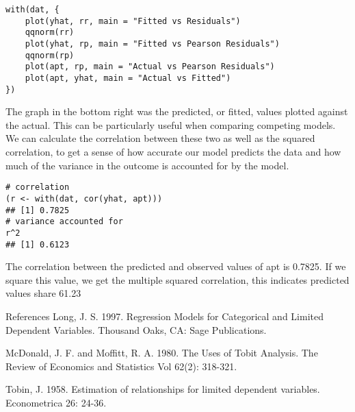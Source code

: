\documentclass{beamer}
\begin{document}
\begin{frame}[fragile]
	\begin{framed}
		\begin{verbatim}
with(dat, {
	plot(yhat, rr, main = "Fitted vs Residuals")
	qqnorm(rr)
	plot(yhat, rp, main = "Fitted vs Pearson Residuals")
	qqnorm(rp)
	plot(apt, rp, main = "Actual vs Pearson Residuals")
	plot(apt, yhat, main = "Actual vs Fitted")
})

\end{verbatim}
\end{framed}
\end{frame}
\begin{frame}[fragile]
The graph in the bottom right was the predicted, or fitted, values plotted against the actual. This can be particularly useful when comparing competing models. We can calculate the correlation between these two as well as the squared correlation, to get a sense of how accurate our model predicts the data and how much of the variance in the outcome is accounted for by the model.
\end{frame}
\begin{frame}[fragile]
	\begin{framed}
		\begin{verbatim}
# correlation
(r <- with(dat, cor(yhat, apt)))
## [1] 0.7825
# variance accounted for
r^2
## [1] 0.6123
\end{verbatim}
\end{framed}
The correlation between the predicted and observed values of apt is 0.7825. If we square this value, we get the multiple squared correlation, this indicates predicted values share 61.23%
\end{frame}
\begin{frame}[fragile]
References
Long, J. S. 1997. Regression Models for Categorical and Limited Dependent Variables. Thousand Oaks, CA: Sage Publications.

McDonald, J. F. and Moffitt, R. A. 1980. The Uses of Tobit Analysis. The Review of Economics and Statistics Vol 62(2): 318-321.

Tobin, J. 1958. Estimation of relationships for limited dependent variables. Econometrica 26: 24-36.
\end{frame}
\end{document}
